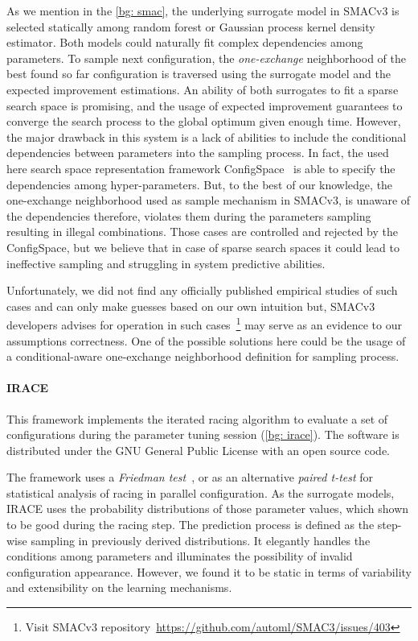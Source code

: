 As we mention in the \cref{bg: smac}, the underlying surrogate model in SMACv3 is selected statically among random forest or Gaussian process kernel density estimator. Both models could naturally fit complex dependencies among parameters. To sample next configuration, the \emph{one-exchange} neighborhood of the best found so far configuration is traversed using the surrogate model and the expected improvement estimations.
An ability of both surrogates to fit a sparse search space is promising, and the usage of expected improvement guarantees to converge the search process to the global optimum given enough time. However, the major drawback in this system is a lack of abilities to include the conditional dependencies between parameters into the sampling process. In fact, the used here search space representation framework ConfigSpace~\cite{configspace} is able to specify the dependencies among hyper-parameters. But, to the best of our knowledge, the one-exchange neighborhood used as sample mechanism in SMACv3, is unaware of the dependencies therefore, violates them during the parameters sampling resulting in illegal combinations. Those cases are controlled and rejected by the ConfigSpace, but we believe that in case of sparse search spaces it could lead to ineffective sampling and struggling in system predictive abilities. 

Unfortunately, we did not find any officially published empirical studies of such cases and can only make guesses based on our own intuition but, SMACv3 developers advises for operation in such cases~\footnote{Visit SMACv3 repository~\url{https://github.com/automl/SMAC3/issues/403}} may serve as an evidence to our assumptions correctness. One of the possible solutions here could be the usage of a conditional-aware one-exchange neighborhood definition for sampling process.


\paragraph{IRACE} This framework implements the iterated racing algorithm to evaluate a set of configurations during the parameter tuning session (\cref{bg: irace}). The software is distributed under the GNU General Public License with an open source code.

The framework uses a \emph{Friedman test}~\cite{conover1980practical}, or as an alternative \emph{paired t-test} for statistical analysis of racing in parallel configuration. As the surrogate models, IRACE uses the probability distributions of those parameter values, which shown to be good during the racing step. The prediction process is defined as the step-wise sampling in previously derived distributions. It elegantly handles the conditions among parameters and illuminates the possibility of invalid configuration appearance. However, we found it to be static in terms of variability and extensibility on the learning mechanisms.

